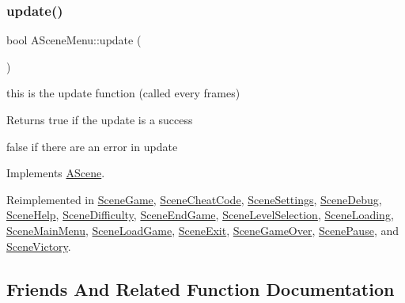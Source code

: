 \subsubsection{\texorpdfstring{update()}{update()}}
{\footnotesize\ttfamily bool A\+Scene\+Menu\+::update (\begin{DoxyParamCaption}{ }\end{DoxyParamCaption})\hspace{0.3cm}{\ttfamily [virtual]}}



this is the update function (called every frames) 

\begin{DoxyReturn}{Returns}
true if the update is a success 

false if there are an error in update 
\end{DoxyReturn}


Implements \hyperlink{class_a_scene_af3ed61809cc5924b9d5530473576a0c7}{A\+Scene}.



Reimplemented in \hyperlink{class_scene_game_a5e23048e3ad8c6fde2d753ed7449e2d5}{Scene\+Game}, \hyperlink{class_scene_cheat_code_ab6ae0c8b3adbce736429e61a27966e31}{Scene\+Cheat\+Code}, \hyperlink{class_scene_settings_ac32c443d620d0417b301193e87885a91}{Scene\+Settings}, \hyperlink{class_scene_debug_a97234cec6e43aa3d891e3f6d2ff51528}{Scene\+Debug}, \hyperlink{class_scene_help_aa5170e0722a6aecbfeea1f920d09cff7}{Scene\+Help}, \hyperlink{class_scene_difficulty_a2a3d3328b04df7047cc03725a9c5eb3c}{Scene\+Difficulty}, \hyperlink{class_scene_end_game_a36b55558e75b9cad9d17a28d8a1ce8d2}{Scene\+End\+Game}, \hyperlink{class_scene_level_selection_a9784885da4583eaba695812bedf8847c}{Scene\+Level\+Selection}, \hyperlink{class_scene_loading_a5b4f2b636e55908bb2f29180aa875201}{Scene\+Loading}, \hyperlink{class_scene_main_menu_a5d095883d0b1fceb3125ef2689a7a09c}{Scene\+Main\+Menu}, \hyperlink{class_scene_load_game_ad33de3b5d98596754f058a4e096ba1b3}{Scene\+Load\+Game}, \hyperlink{class_scene_exit_a60fd49ea48551bd3035efa7cabe4d08d}{Scene\+Exit}, \hyperlink{class_scene_game_over_ac4547b0ed87f3c324e75dafb8f96b5af}{Scene\+Game\+Over}, \hyperlink{class_scene_pause_a376de6952be83718fb19d268d9327ef6}{Scene\+Pause}, and \hyperlink{class_scene_victory_aea51a7b48a3243175e1759b20f853c16}{Scene\+Victory}.



\subsection{Friends And Related Function Documentation}
\mbox{\label{class_a_scene_menu_a402599a9f1ae99fd18976f6f3616fcc1}} 
